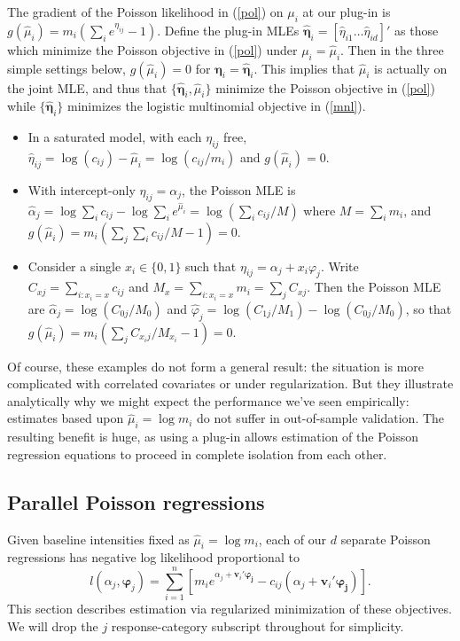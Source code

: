 \documentclass[12pt]{article}
\newcommand{\bs}[1]{\boldsymbol{#1}}
\newcommand{\bm}[1]{\mathbf{#1}}
\begin{document}
The gradient of the Poisson likelihood in (\ref{pol}) on $\mu_i$ at our
plug-in is $g(\hat \mu_i) = m_i \left(\sum_i e^{\eta_{ij}}-1\right)$.  
Define the plug-in MLEs $\bs{\hat\eta}_{i}
  = [\hat\eta_{i1}\ldots\hat\eta_{id}]'$ as those which minimize the Poisson
  objective in (\ref{pol}) under $\mu_i=\hat\mu_i$.  Then in the
three simple settings below, $g(\hat
\mu_i)=0$ for $\bs{\eta}_i = \bs{\hat\eta}_{i}$. This implies that $\hat\mu_i$
is actually on the joint MLE, and thus that $\{\bs{\hat\eta}_{i},\hat\mu_i\}$ minimize the
 Poisson objective in (\ref{pol}) while $\{ \bs{\hat\eta}_{i}\}$ minimizes the logistic multinomial objective in (\ref{mnl}).
\begin{itemize}
\item In a saturated model, with
each $\eta_{ij}$ free, $\hat
\eta_{ij} = \log(c_{ij}) - \hat \mu_i = \log(c_{ij}/m_i)$ and $g(\hat
\mu_i) = 0$.
\item With intercept-only $\eta_{ij} =
\alpha_j$, the Poisson MLE is $\hat\alpha_j = \log \sum_i c_{ij} - \log
\sum_i e^{\hat\mu_i} = \log\left( \sum_i c_{ij}/M \right)$ where $M = \sum_i
m_i$, and $g(\hat \mu_i) = m_i(\sum_j \sum_i c_{ij}/M -1) = 0$.
\item Consider a single
$x_i \in
\{0,1\}$ such that $\eta_{ij} = \alpha_j + x_i \varphi_j$.  Write $C_{xj} = \sum_{i: x_i=x} c_{ij}$ and  $M_{x} = \sum_{i:
x_i=x} m_i = \sum_j C_{xj}$.  Then the Poisson MLE are $\hat\alpha_j =
\log(C_{0j}/M_0)$ and $\hat\varphi_j = \log(C_{1j}/M_1) - \log(C_{0j}/M_0)$,
so that  $g(\hat \mu_i) = m_i\left(\sum_j C_{x_ij}/M_{x_i} -1 \right) =0$.
\end{itemize}
Of course, these examples do not form a general result: the situation is more
complicated with correlated covariates or under regularization. But they
illustrate analytically why we might expect the performance we've seen
empirically: estimates based upon $\hat \mu_i = \log m_i$ do not suffer in
out-of-sample validation. The resulting benefit is huge, as using a plug-in
allows estimation of the Poisson regression equations to proceed in complete
isolation from each other.

\subsection{Parallel Poisson regressions}
\label{GL}

Given baseline intensities fixed as $\hat \mu_i = \log m_i$, each of our $d$
separate Poisson regressions has negative log likelihood proportional to
\begin{equation}\label{obj}
l(\alpha_j, \bs{\varphi}_j) = \sum_{i=1}^n \left[ m_i 
e^{\alpha_j + \bm{v}_i'\bs{\varphi_j}} - c_{ij}(\alpha_j + \bm{v}_i'\bs{\varphi_j})\right].
\end{equation}
This section describes estimation via regularized minimization of these
objectives. We will drop the $j$ response-category subscript throughout for
simplicity.
\end{document}
